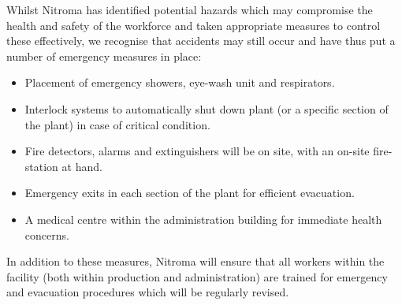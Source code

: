 Whilst Nitroma has identified potential hazards which may compromise the health and safety of the workforce and taken appropriate measures to control these effectively, we recognise that accidents may still occur and have thus put a number of emergency measures in place:
 
\begin{itemize}
    \item Placement of emergency showers, eye-wash unit and respirators.
\item Interlock systems to automatically shut down plant (or a specific section of the plant) in case of critical condition. 
\item Fire detectors, alarms and extinguishers will be on site, with an on-site fire-station at hand.
    \item Emergency exits in each section of the plant for efficient evacuation. 
\item  A medical centre within the administration building for immediate health concerns.
\end{itemize}

In addition to these measures, Nitroma will ensure that all workers within the facility (both within production and administration) are trained for emergency and evacuation procedures which will be regularly revised. 




 